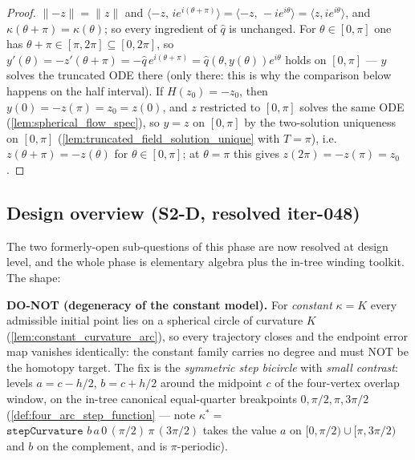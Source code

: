 \begin{proof}

\leanok
  $\|{-z}\|=\|z\|$ and $\langle -z,\,ie^{i(\theta+\pi)}\rangle=\langle -z,\,-ie^{i\theta}
  \rangle=\langle z,ie^{i\theta}\rangle$, and $\kappa(\theta+\pi)=\kappa(\theta)$; so
  every ingredient of $\hat q$ is unchanged. For $\theta\in[0,\pi]$ one has
  $\theta+\pi\in[\pi,2\pi]\subseteq[0,2\pi]$, so
  $y'(\theta)=-z'(\theta+\pi)=-\hat q\,e^{i(\theta+\pi)}=\hat q(\theta,y(\theta))e^{i\theta}$
  holds on $[0,\pi]$ — $y$ solves the truncated ODE there (only there: this is why the
  comparison below happens on the half interval). If $H(z_0)=-z_0$, then
  $y(0)=-z(\pi)=z_0=z(0)$, and $z$ restricted to $[0,\pi]$ solves the same ODE
  (\cref{lem:spherical_flow_spec}), so $y=z$ on $[0,\pi]$ by the two-solution
  uniqueness on $[0,\pi]$ (\cref{lem:truncated_field_solution_unique} with $T=\pi$),
  i.e.\ $z(\theta+\pi)=-z(\theta)$ for $\theta\in[0,\pi]$; at $\theta=\pi$ this gives
  $z(2\pi)=-z(\pi)=z_0$.
\end{proof}

\subsection*{Design overview (S2-D, resolved iter-048)}

The two formerly-open sub-questions of this phase are now resolved at design level, and
the whole phase is elementary algebra plus the in-tree winding toolkit. The shape:

\textbf{DO-NOT (degeneracy of the constant model).} For \emph{constant} $\kappa=K$ every
admissible initial point lies on a spherical circle of curvature $K$
(\cref{lem:constant_curvature_arc}), so every trajectory closes and the endpoint error
map vanishes identically: the constant family carries no degree and must NOT be the
homotopy target. The fix is the \emph{symmetric step bicircle} with \emph{small
contrast}: levels $a=c-h/2$, $b=c+h/2$ around the midpoint $c$ of the four-vertex
overlap window, on the in-tree canonical equal-quarter breakpoints $0,\pi/2,\pi,3\pi/2$
(\cref{def:four_arc_step_function} — note $\kappa^\ast=$
$\texttt{stepCurvature } b\,a\,0\,(\pi/2)\,\pi\,(3\pi/2)$ takes the value $a$ on
$[0,\pi/2)\cup[\pi,3\pi/2)$ and $b$ on the complement, and is $\pi$-periodic).

